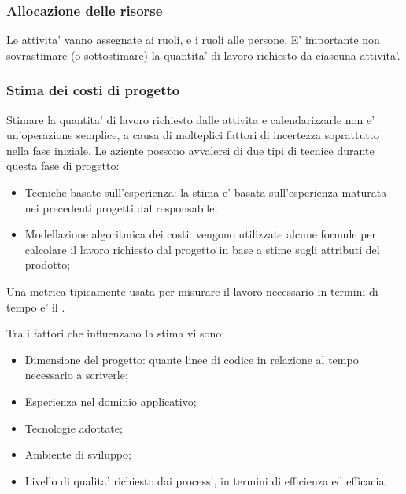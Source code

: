 
\subsubsection{Allocazione delle risorse}

Le attivita' vanno assegnate ai ruoli, e i ruoli alle persone. E' importante non
sovrastimare (o sottostimare) la quantita' di lavoro richiesto da ciascuna
attivita'.

\subsubsection{Stima dei costi di progetto}

Stimare la quantita' di lavoro richiesto dalle attivita e calendarizzarle non e'
un'operazione semplice, a causa di molteplici fattori di incertezza soprattutto
nella fase iniziale. Le aziente possono avvalersi di due tipi di tecnice durante
questa fase di progetto:

\begin{itemize}
  \item Tecniche basate sull'esperienza: la stima e' basata sull'esperienza
    maturata nei precedenti progetti dal responsabile;
  \item Modellazione algoritmica dei costi: vengono utilizzate alcune formule
    per calcolare il lavoro richiesto dal progetto in base a stime sugli
    attributi del prodotto;
\end{itemize}

Una \gls{metrica} tipicamente usata per misurare il lavoro necessario in termini
di tempo e' il .

Tra i fattori che influenzano la stima vi sono:

\begin{itemize}
  \item Dimensione del progetto: quante linee di codice in relazione al
    tempo necessario a scriverle;
  \item Esperienza nel dominio applicativo;
  \item Tecnologie adottate;
  \item Ambiente di sviluppo;
  \item Livello di qualita' richiesto dai processi, in termini di
    efficienza ed efficacia;
\end{itemize}

